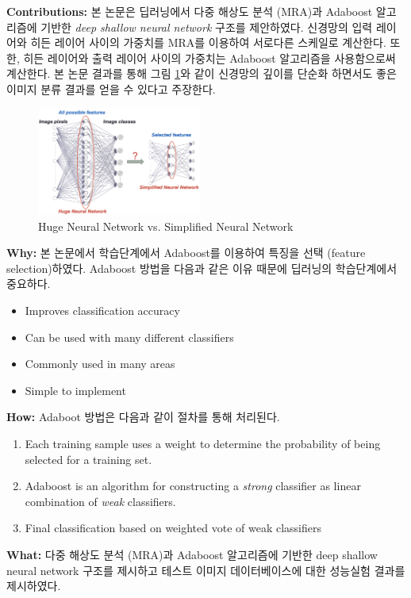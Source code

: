 \documentclass[twocolumn]{article}
\newcommand{\bi}{\begin{itemize}}
\newcommand{\ei}{\end{itemize}}
\newcommand{\be}{\begin{enumerate}}
\newcommand{\ee}{\end{enumerate}}
\newcommand{\ii}{\item}
\begin{document}
\noindent
\textbf{Contributions:}  본 논문은 딥러닝에서 다중 해상도 분석 (MRA)과 Adaboost 알고리즘에 기반한  \textit{deep shallow neural network} 구조를 제안하였다.  신경망의 입력 레이어와 히든 레이어 사이의 가중치를 MRA를 이용하여 서로다른 스케일로 계산한다. 또한, 히든 레이어와 출력 레이어 사이의 가중치는 Adaboost 알고리즘을 사용함으로써 계산한다. 본 논문 결과를 통해 그림 \ref{fig:neuralnetwork}와 같이 신경망의 깊이를 단순화 하면서도 좋은 이미지 분류 결과를 얻을 수 있다고 주장한다.

\begin{figure}[htb]
        \centering
        \includegraphics[width=0.48\textwidth]{neural-network.png}
        \caption{Huge Neural Network vs. Simplified Neural Network}
        \label{fig:neuralnetwork}
\end{figure}

\noindent
\textbf{Why:}  본 논문에서 학습단계에서 Adaboost를 이용하여 특징을 선택 (feature selection)하였다. Adaboost 방법을 다음과 같은 이유 때문에 딥러닝의 학습단계에서 중요하다.
\bi
\ii Improves classification accuracy
\ii Can be used with many different classifiers
\ii Commonly used in many areas
\ii Simple to implement
\ei

\noindent
\textbf{How:}  Adaboot 방법은 다음과 같이 절차를 통해 처리된다.
\be
\ii Each training sample uses a weight to determine the probability of being selected for
    a training set.
\ii Adaboost is an algorithm for constructing a \textit{strong} classifier as linear combination of \textit{weak} classifiers.
\ii Final classification based on weighted vote of weak classifiers
\ee

\noindent
\textbf{What:} 다중 해상도 분석 (MRA)과 Adaboost 알고리즘에 기반한  deep shallow neural network 구조를 제시하고 테스트 이미지 데이터베이스에 대한 성능실험 결과를 제시하였다.

%
%
%
\end{document}
